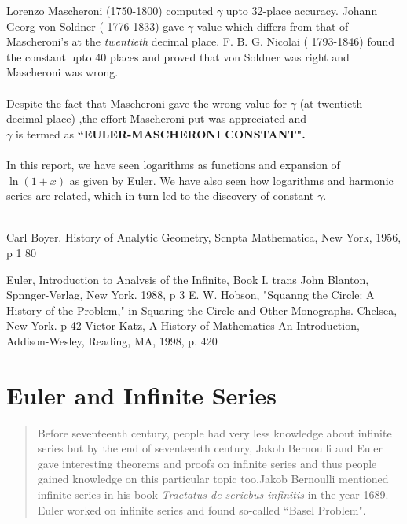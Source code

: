 \documentclass[a4paper,reqno,11pt]{book}
\theoremstyle{plain}%
\theoremstyle{definition}
\begin{document}
\noindent Lorenzo 
Mascheroni (1750-1800) computed $\gamma$ upto 32-place accuracy. 
Johann Georg von Soldner ( 1776-1833) gave $\gamma$ value which differs from that of
Mascheroni's at the \textit{twentieth} decimal place. F. B. G. Nicolai ( 1793-1846) found the constant upto 40 places and proved that  von Soldner 
was right and Mascheroni was wrong.\\
\\
Despite the fact that Mascheroni gave the wrong value for $\gamma$ (at twentieth decimal place) ,the effort Mascheroni put was appreciated and \\$\gamma$ is termed as \textbf{``EULER-MASCHERONI CONSTANT".}\\
\\
In this report, we have seen logarithms as functions and expansion of $\ln(1+x)$ as given by Euler. We have also seen how logarithms and harmonic series are related, which in turn led to the discovery of constant $\gamma.$
\\
\\
\begin{thebibliography}{99}
		
		 Carl Boyer. History of Analytic Geometry, Scnpta Mathematica, New York, 1956, p 1 80
		
		 Euler, Introduction to Analvsis of the Infinite, Book I. trans John Blanton, Spnnger-Verlag, New 
York. 1988, p 3
   E. W. Hobson, "Squanng the Circle: A History of the Problem," in Squaring the Circle and Other 
Monographs. Chelsea, New York. p 42 
 Victor Katz, A History of Mathematics An Introduction, Addison-Wesley, Reading, MA, 1998, 
p. 420

		

		
		
	\end{thebibliography}
 
 \chapter{Euler and Infinite Series}
 \begin{abstract}
	 Before seventeenth century, people had very less knowledge about infinite series but by the end of seventeenth century, Jakob Bernoulli and Euler gave interesting theorems and proofs on infinite series and thus people gained knowledge on this particular topic too.Jakob Bernoulli mentioned infinite series in his book \textit{Tractatus de seriebus infinitis} in the year 1689.
Euler worked on infinite series and found so-called ``Basel Problem".\\
	\end{abstract}
	
\end{document}
